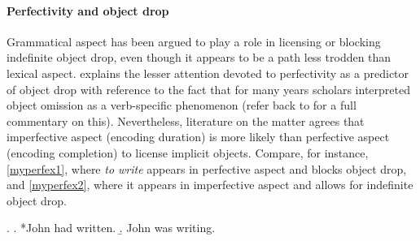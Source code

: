 \paragraph{Perfectivity and object drop}
Grammatical aspect has been argued to play a role in licensing or blocking indefinite object drop, even though it appears to be a path less trodden than lexical aspect. \textcite[30]{Medina2007} explains the lesser attention devoted to perfectivity as a predictor of object drop with reference to the fact that for many years scholars interpreted object omission as a verb-specific phenomenon (refer back to  for a full commentary on this). Nevertheless, literature on the matter \parencite{Lorenzetti2008, Cote1996, Naess2007, TsimpliPapadopoulou2006, Dvorak2017thesis} agrees that imperfective aspect (encoding duration) is more likely than perfective aspect (encoding completion) to license implicit objects. Compare, for instance, \ref{myperfex1}, where \textit{to write} appears in perfective aspect and blocks object drop, and \ref{myperfex2}, where it appears in imperfective aspect and allows for indefinite object drop.

\ex. \label{myperfex} \a. \label{myperfex1} *John had written.
\b. \label{myperfex2} John was writing.

